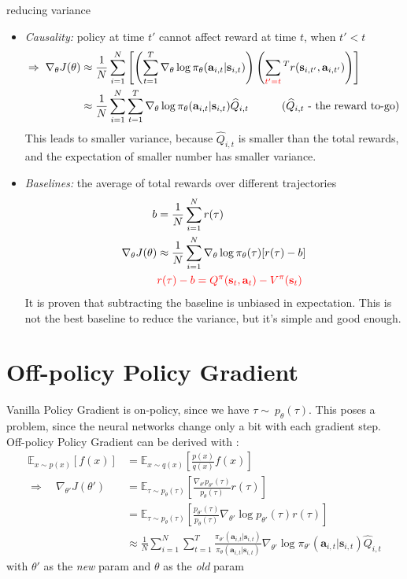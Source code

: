  reducing variance
\begin{itemize}
	\item \textit{Causality:} policy at time $t'$ cannot affect reward at time $t$, when $t'<t$
	\begin{align}
		\Rightarrow\; \nabla_\theta J(\theta) & \approx \frac{1}{N} \sum_{i=1}^{N} \left[ \left( \sum_{t=1}^{T} \nabla_\theta\log \pi_\theta(\textbf{a}_{i,t} | \textbf{s}_{i,t} ) \right) \left( \sum_{\color{red} t'=t}^{T} r(\textbf{s}_{i,t'}, \textbf{a}_{i,t'}) \right) \right]\\
		& \approx \frac{1}{N} \sum_{i=1}^{N} \sum_{t=1}^{T} \nabla_\theta\log \pi_\theta(\textbf{a}_{i,t} | \textbf{s}_{i,t} ) \widehat{Q}_{i,t} \qquad\quad (\widehat{Q}_{i,t} \text{ - the reward to-go})
		\label{eq:Q-value}
	\end{align}
	This leads to smaller variance, because $\widehat{Q}_{i,t}$ is smaller than the total rewards, and the expectation of smaller number has smaller variance.
	\item \textit{Baselines:} the average of total rewards over different trajectories
	\begin{align}
		b &= \frac{1}{N} \sum_{i=1}^{N}r(\tau)\\
		\nabla_\theta J(\theta) & \approx \frac{1}{N} \sum_{i=1}^{N} \nabla_\theta\log \pi_\theta(\tau) [r(\tau)-b]\\
		& {\color{red} r(\tau)-b = Q^\pi(\textbf{s}_t, \textbf{a}_t) - V^\pi(\textbf{s}_t)}
	\end{align}
	It is proven that subtracting the baseline is unbiased in expectation. This is not the best baseline to reduce the variance, but it's simple and good enough.
\end{itemize}

\section{Off-policy Policy Gradient}
Vanilla Policy Gradient is on-policy, since we have $\tau\sim\ p_\theta(\tau)$. This poses a problem, since the neural networks change only a bit with each gradient step. Off-policy Policy Gradient can be derived with :
\begin{align}
	\mathbb{E}_{x\sim p(x)}[f(x)] &= \mathbb{E}_{x\sim q(x)} \left[\frac{p(x)}{q(x)}f(x)\right]\\
	\Rightarrow \quad \nabla_{\theta'} J(\theta') & = \mathbb{E}_{\tau \sim p_{\theta}(\tau)} \left[ \frac{\nabla_{\theta'} p_{\theta'}(\tau)}{p_{\theta}(\tau)} r(\tau) \right]\\
	&= \mathbb{E}_{\tau \sim p_{\theta}(\tau)} \left[ \frac{p_{\theta'}(\tau)}{p_{\theta}(\tau)} \nabla_{\theta'}\log p_{\theta'}(\tau) r(\tau) \right]\\
	&\approx \frac{1}{N} \sum_{i=1}^N \sum_{t=1}^T \frac{\pi_{\theta'}(\textbf{a}_{i,t} | \textbf{s}_{i,t})}{\pi_{\theta}(\textbf{a}_{i,t} | \textbf{s}_{i,t})} \nabla_{\theta'} \log \pi_{\theta'} (\textbf{a}_{i,t} | \textbf{s}_{i,t}) \widehat{Q}_{i,t}
\end{align}
with $\theta'$ as the \textit{new} \ac{param} and $\theta$ as the \textit{old} \ac{param}

